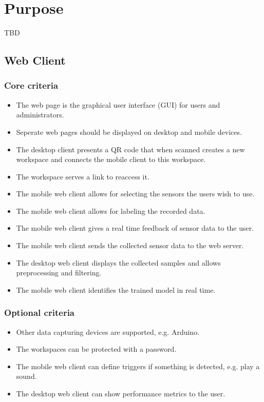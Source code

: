 \section{Purpose}
TBD

\subsection{Web Client}
\subsubsection{Core criteria}
\begin{itemize}
    \item The web page is the graphical user interface (GUI) for users and administrators.
    \item Seperate web pages should be displayed on desktop and mobile devices. %
    \item The desktop client presents a QR code that when scanned creates a new workspace and connects the mobile client to
          this workspace.
    \item The workspace serves a link to reaccess it.
    \item The mobile web client allows for selecting the sensors the users wish to use.
    \item The mobile web client allows for labeling the recorded data.
    \item The mobile web client gives a real time feedback of sensor data to the user.
    \item The mobile web client sends the collected sensor data to the web server.
    \item The desktop web client displays the collected samples and allows preprocessing and filtering.
    \item The mobile web client identifies the trained model in real time.
\end{itemize}

\subsubsection{Optional criteria}
\begin{itemize}
    \item Other data capturing devices are supported, e.g. Arduino.
    \item The workspaces can be protected with a password.
    \item The mobile web client can define triggers if something is detected, e.g. play a sound.
    \item The desktop web client can show performance metrics to the user.
\end{itemize}

